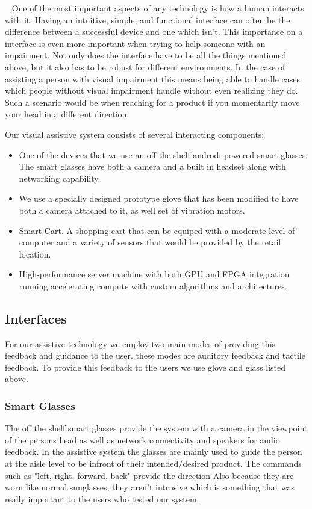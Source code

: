 ~\cite{something}
One of the most important aspects of any technology is how a human interacts with it.
Having an intuitive, simple, and functional interface can often be the difference between
a successful device and one which isn't. This importance on a interface is even more important
when trying to help someone with an impairment. Not only does the interface have to be all
the things mentioned above, but it also has to be robust for different environments. In the
case of assisting a person with visual impairment this means being able to handle cases
which people without visual impairment handle without even realizing they do. Such a scenario
would be when reaching for a product if you momentarily move your head in a different direction.

Our visual assistive system consists of several interacting components: 

\begin{itemize}
\item One of the devices that we use an off the shelf androdi powered smart glasses. 
The smart glasses have both a camera and a built in headset along with
networking capability. 

\item We use a specially designed prototype glove that has been
modified to have both a camera attached to it, as well set of
vibration motors. 

\item Smart Cart. A shopping cart that can be equiped with a moderate level of computer
and a variety of sensors that would be provided by the retail location.

\item High-performance server machine with both GPU and FPGA integration running
accelerating compute with custom algorithms and architectures.

\end{itemize}

\subsection{Interfaces}
For our assistive technology we employ two main modes of providing this feedback and guidance to the user. these modes are auditory feedback and tactile feedback. To provide this feedback to the users we use glove and glass listed above.

\subsubsection{Smart Glasses}
The off the shelf smart glasses provide the system with a camera in the viewpoint
of the persons head as well as network connectivity and speakers for audio feedback.
In the assistive system the glasses are mainly used to guide the person at the aisle level
to be infront of their intended/desired product. The commands such as "left, right, forward, back"
provide the direction
 Also because they are worn like normal
sunglasses, they aren't intrusive which is something that was really
important to the users who tested our system.

